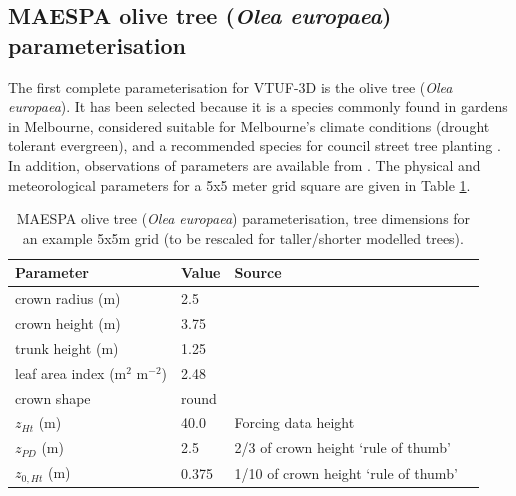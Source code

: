 \documentclass[final,3p,times,authoryear]{elsarticle}
\begin{document}
\subsection{MAESPA olive tree (\textit{Olea europaea}) parameterisation}
The first complete parameterisation for VTUF-3D is the olive tree (\textit{Olea europaea}). It has been selected because it is a species commonly found in gardens in Melbourne, considered suitable for Melbourne's climate conditions (drought tolerant evergreen), and a recommended species for council street tree planting \citep{PortPhillip2010}. In addition, observations of parameters are available from \cite{Coutts2014a}. The physical and meteorological parameters for a 5x5 meter grid square are given in Table \ref{tab:olivescaled}. 

\begin{center}
\begin{table}[!htbp]
\caption{MAESPA olive tree (\textit{Olea europaea}) parameterisation, tree dimensions for an example 5x5m grid (to be rescaled for taller/shorter modelled trees).\label{tab:olivescaled}}
\begin{tabular}{ |  l | l | l | l |}
\hline \textbf{Parameter} & \textbf{Value} & \textbf{Source} \\ 
\hline
crown radius (m) & 2.5 & \cite{Coutts2014a}\\ \hline
crown height (m) & 3.75 & \cite{Coutts2014a}\\ \hline
trunk height (m) & 1.25 & \cite{Coutts2014a}\\ \hline
leaf area index (m$^{2}$ m$^{-2}$)&2.48 &\cite{Mariscal2000}\\ \hline
crown shape & round &\\ \hline
$z_{Ht}$ (m)&40.0&Forcing data height \\ \hline
$z_{PD}$ (m) &2.5& 2/3 of crown height `rule of thumb' \citep{Grimmond1999}\\ \hline
$z_{0,Ht}$ (m) &0.375& 1/10 of crown height `rule of thumb' \citep{Grimmond1999} \\ \hline
\end{tabular} 
\end{table}
\end{center}


%
%
%
%
\end{document}
